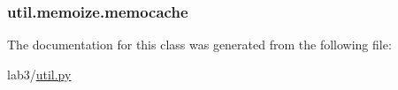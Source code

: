\subsubsection[{memocache}]{\setlength{\rightskip}{0pt plus 5cm}util.\+memoize.\+memocache}\label{classutil_1_1memoize_a403e0fd68392e06f99df667a511f11df}


The documentation for this class was generated from the following file\+:\begin{DoxyCompactItemize}
\item 
lab3/\hyperlink{util_8py}{util.\+py}\end{DoxyCompactItemize}
